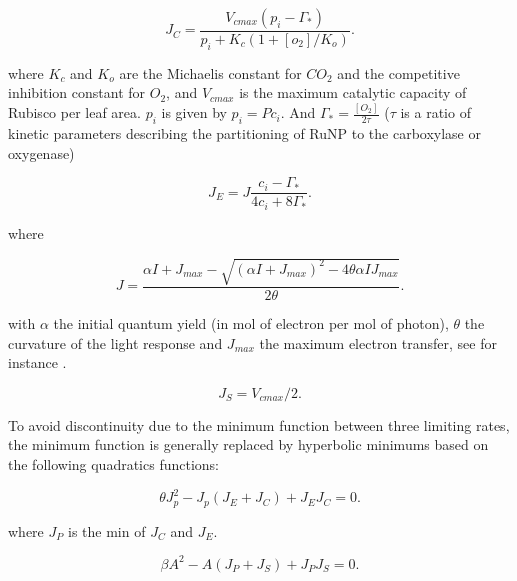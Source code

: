 \documentclass[a4paper,11pt]{article}
\begin{document}


\begin{equation}
\label{eq:JC}
J_C= \frac{V_{cmax} (p_i - \Gamma_*)}{p_i + K_c (1+[o_2]/K_o)}.
\end{equation}

where $K_c$ and $K_o$ are the Michaelis constant for $CO_2$ and the competitive inhibition constant for $O_2$, and $V_{cmax}$ is the maximum catalytic capacity of Rubisco per leaf area.
$p_i$ is given by $p_i = P c_i$. And $\Gamma_* = \frac{[O_2]}{2\tau}$ ($\tau$ is a ratio of kinetic parameters describing the partitioning of RuNP to the carboxylase or oxygenase)

\begin{equation}
\label{eq:JCb}
J_E = J \frac{ c_i - \Gamma_*}{4c_i + 8 \Gamma_*}.
\end{equation}

where

\begin{equation}
\label{eq:Jlight}
J = \frac{ \alpha I + J_{max} - \sqrt{(\alpha I + J_{max})^2 - 4 \theta \alpha I J_{max}}}{2\theta}.
\end{equation}

with $\alpha$ the initial quantum yield (in mol of electron per mol of photon), $\theta$ the curvature of the light response and $J_{max}$ the maximum electron transfer,
see for instance \citet{Bernacchi-2009}.


\begin{equation}
\label{eq:JS}
J_S= V_{cmax}/2.
\end{equation}

To avoid discontinuity due to the minimum function between three
limiting rates, the minimum function is generally replaced by
hyperbolic minimums based on the following quadratics functions:

\begin{equation}
\label{eq:Q1}
\theta J_p^2 - J_p(J_E+J_C) + J_E J_C= 0.
\end{equation}

where $J_P$ is the min of $J_C$ and $J_E$.

\begin{equation}
\label{eq:Q2}
\beta A^2 - A(J_P+J_S) + J_P J_S= 0.
\end{equation}
\end{document}
